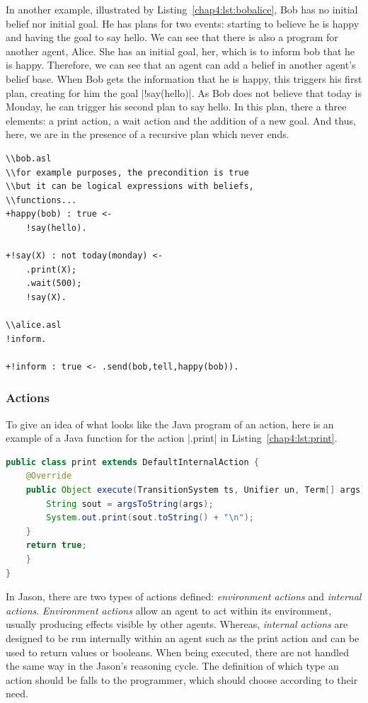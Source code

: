 \documentclass[a4paper,11pt,twoside]{StyleThese}
\begin{document}
In another example, illustrated by Listing~\ref{chap4:lst:bobalice}, Bob has no initial belief nor initial goal. He has plans for two events: starting to believe he is happy and having the goal to say hello. We can see that there is also a program for another agent, Alice. She has an initial goal, her, which is to inform bob that he is happy. Therefore, we can see that an agent can add a belief in another agent's belief base. When Bob gets the information that he is happy, this triggers his first plan, creating for him the goal |!say(hello)|. As Bob does not believe that today is Monday, he can trigger his second plan to say hello. In this plan, there a three elements: a print action, a wait action and the addition of a new goal. And thus, here, we are in the presence of a recursive plan which never ends. 

\begin{lstlisting}[caption={ASL programs of Bob and Alice, two Jason agent}, label={chap4:lst:bobalice}]
\\bob.asl
\\for example purposes, the precondition is true
\\but it can be logical expressions with beliefs,
\\functions...
+happy(bob) : true <- 
	!say(hello).

+!say(X) : not today(monday) <- 
	.print(X); 
	.wait(500); 
	!say(X).

\\alice.asl
!inform.

+!inform : true <- .send(bob,tell,happy(bob)).
\end{lstlisting} 

\subsubsection{Actions} To give an idea of what looks like the Java program of an action, here is an example of a Java function for the action |.print| in Listing~\ref{chap4:lst:print}.

\begin{lstlisting}[caption={.print action}, label={chap4:lst:print}, language=Java]
public class print extends DefaultInternalAction {
	@Override
	public Object execute(TransitionSystem ts, Unifier un, Term[] args) throws Exception {
		String sout = argsToString(args);
		System.out.print(sout.toString() + "\n");
	}
	return true;
	}
}
\end{lstlisting} 

In Jason, there are two types of actions defined: \emph{environment actions} and \emph{internal actions}. \emph{Environment actions} allow an agent to act within its environment, usually producing effects visible by other agents. Whereas, \emph{internal actions} are designed to be run internally within an agent such as the print action and can be used to return values or booleans. When being executed, there are not handled the same way in the Jason's reasoning cycle. The definition of which type an action should be falls to the programmer, which should choose according to their need.
\end{document}
